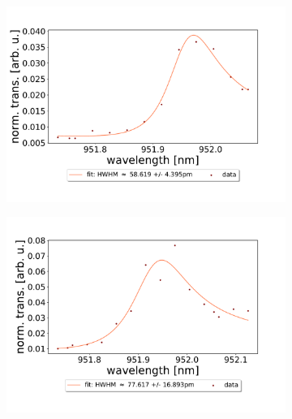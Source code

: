 \begin{figure}[h!]
    \centering
    \begin{subfigure}[b]{0.49\textwidth}
        \includegraphics[width=\textwidth]{figures/results/double fano fits/20250326/251um_M3:M5_fit_1.pdf}
        \caption{}
        \label{fig:251um_M3:M5_fit_1}
    \end{subfigure}
    \begin{subfigure}[b]{0.49\textwidth}
        \includegraphics[width=\textwidth]{figures/results/double fano fits/20250326/251um_M3:M5_fit_2.pdf}
        \caption{}
        \label{fig:251um_M3:M5_fit_2}
    \end{subfigure}
    \begin{subfigure}[b]{0.49\textwidth}

\end{subfigure}
\end{figure}
